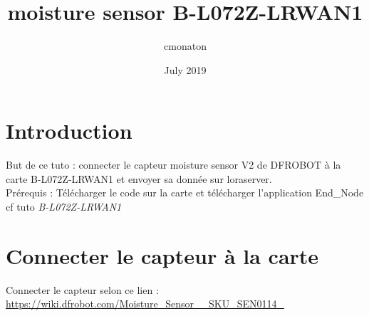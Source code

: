 \documentclass{article}
\title{moisture sensor B-L072Z-LRWAN1}
\author{cmonaton }
\date{July 2019}
\begin{document}
\maketitle

\section{Introduction}

But de ce tuto : connecter le capteur moisture sensor V2 de DFROBOT à la carte B-L072Z-LRWAN1 et envoyer sa donnée sur loraserver.\\
Prérequis : Télécharger le code sur la carte et télécharger l'application End\_Node cf tuto \textit{B-L072Z-LRWAN1}



\section{Connecter le capteur à la carte}





Connecter le capteur selon ce lien : \url{https://wiki.dfrobot.com/Moisture_Sensor__SKU_SEN0114_}
\end{document}
